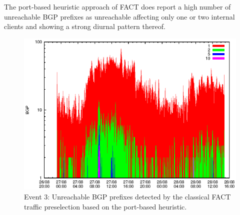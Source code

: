 The port-based heuristic approach of FACT does report a high number of 
unreachable BGP prefixes as unreachable affecting only one or two internal 
clients and showing a strong diurnal pattern thereof. 

\begin{figure}
	[p] \centering 
	\includegraphics[width=0.75\linewidth]{images/events/2010_08_27/bgp_log_port80_ref.eps} \caption{Event 3: Unreachable BGP prefixes detected by the classical FACT traffic preselection based on the port-based heuristic.} 
	\label{fig:RIPE_FACT_REF} 
\end{figure}

